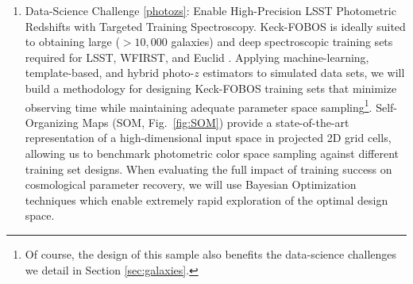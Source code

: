 \documentclass[oneside,11pt]{amsart}
\newcounter{chalno}
\newcommand{\chal}[1]{\refstepcounter{chalno}\label{#1}}
\begin{document}



\medskip
%
\chal{photozs}
%

 \begin{enumerate}[rightmargin=0.2cm,leftmargin=0.2cm]

\item[] {\textsf {\large Data-Science Challenge \ref{photozs}: Enable
High-Precision LSST Photometric Redshifts with Targeted Training
Spectroscopy}}.  Keck-FOBOS is ideally suited to obtaining large
($>10,000$ galaxies) and deep spectroscopic training sets required for
LSST, WFIRST, and Euclid \citep[see][] {newman15}.  Applying
machine-learning, template-based, and hybrid photo-$z$ estimators to
simulated data sets, we will build a methodology for designing
Keck-FOBOS training sets that minimize observing time while maintaining
adequate parameter space sampling\footnote{
%
Of course, the design of this sample also benefits the data-science
challenges we detail in Section \ref{sec:galaxies}.}.
%
Self-Organizing Maps (SOM, Fig.~\ref {fig:SOM}) provide a
state-of-the-art representation of a high-dimensional input space in
projected 2D grid cells, allowing us to benchmark photometric color
space sampling against different training set designs.  When evaluating
the full impact of training success on cosmological parameter recovery,
we will use Bayesian Optimization techniques which enable extremely
rapid exploration of the optimal design space.


\end{enumerate}
\end{document}
